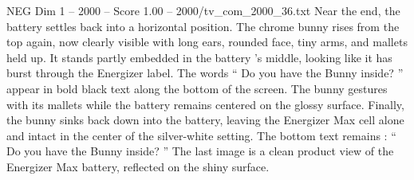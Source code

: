 \begin{textsample}{NEG Dim 1 – 2000 – Score 1.00 – 2000/tv\_com\_2000\_36.txt}
Near the end, the battery settles back into a horizontal position.
The chrome bunny rises from the top again, now clearly visible with long ears, rounded face, tiny arms, and mallets held up.
It stands partly embedded in the battery ’s middle, looking like it has burst through the Energizer label.
The words “ Do you have the Bunny inside? ” appear in bold black text along the bottom of the screen.
The bunny gestures with its mallets while the battery remains centered on the glossy surface.
Finally, the bunny sinks back down into the battery, leaving the Energizer Max cell alone and intact in the center of the silver-white setting.
The bottom text remains : “ Do you have the Bunny inside? ” The last image is a clean product view of the Energizer Max battery, reflected on the shiny surface.

\end{textsample}
